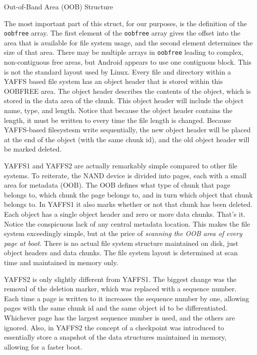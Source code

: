 \begin{table}[htb]

\caption{Out-of-Band Area (OOB) Structure}
\label{tab:oob}
\end{table}

The most important part of this struct, for our purposes, is the definition of the \texttt{oobfree} array.  The first element of the
\texttt{oobfree} array gives the offset into the area that is available for file system usage, and the second element determines the
size of that area.  There may be multiple arrays in \texttt{oobfree} leading to complex, non-contiguous free areas, but Android
appears to use one contiguous block.  This is not the standard layout used by Linux. Every file and directory within a YAFFS based
file system has an object header that is stored within this OOBFREE area. The object header describes the contents of the object,
which is stored in the data area of the chunk. This object header will include the object name, type, and length.  Notice that
because the object header contains the length, it must be written to every time the file length is changed.  Because YAFFS-based
filesystesm write sequentially, the new object header will be placed at the end of the object (with the same chunk id), and the old
object header will be marked deleted. 

YAFFS1 and YAFFS2 are actually remarkably simple compared to other file systems. To reiterate, the NAND device is divided into
pages, each with a small area for metadata (OOB).  The OOB defines what type of chunk that page belongs to, which chunk the page
belongs to, and in turn which object that chunk belongs to.  In YAFFS1 it also marks whether or not that chunk has been deleted.
Each object has a single object header and zero or more data chunks.  That's it.  Notice the conspicuous lack of any central
metadata location.  This makes the file system exceedingly simple, but at the price of \emph{scanning the OOB area of every page at
boot}.  There is no actual file system structure maintained on disk, just object headers and data chunks.  The file system layout is
determined at scan time and maintained in memory only. 

YAFFS2 is only slightly different from YAFFS1. The biggest change was the removal of the deletion marker, which was replaced with a
sequence number. Each time a page is written to it increases the sequence number by one, allowing pages with the same chunk id and
the same object id to be differentiated.  Whichever page has the largest sequence number is used, and the others are ignored.  Also,
in YAFFS2 the concept of a checkpoint was introduced to essentially store a snapshot of the data structures maintained in memory,
allowing for a faster boot.

